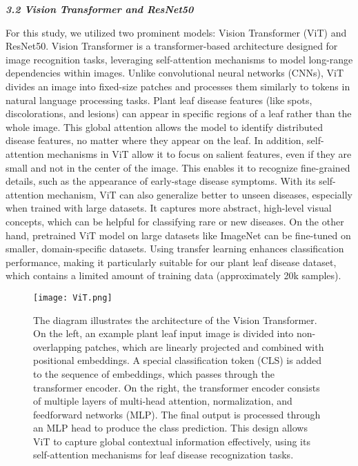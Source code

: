 \documentclass{article}
\begin{document}
\textbf{\textit{3.2 Vision Transformer and ResNet50}}

For this study, we utilized two prominent models: Vision Transformer (ViT) and ResNet50. Vision Transformer is a transformer-based architecture designed for image recognition tasks, leveraging self-attention mechanisms to model long-range dependencies within images. Unlike convolutional neural networks (CNNs), ViT divides an image into fixed-size patches and processes them similarly to tokens in natural language processing tasks. Plant leaf disease features (like spots, discolorations, and lesions) can appear in specific regions of a leaf rather than the whole image. This global attention allows the model to identify distributed disease features, no matter where they appear on the leaf. In addition, self-attention mechanisms in ViT allow it to focus on salient features, even if they are small and not in the center of the image. This enables it to recognize fine-grained details, such as the appearance of early-stage disease symptoms. With its self-attention mechanism, ViT can also generalize better to unseen diseases, especially when trained with large datasets. It captures more abstract, high-level visual concepts, which can be helpful for classifying rare or new diseases. On the other hand, pretrained ViT model on large datasets like ImageNet can be fine-tuned on smaller, domain-specific datasets. Using transfer learning enhances classification performance, making it particularly suitable for our plant leaf disease dataset, which contains a limited amount of training data (approximately 20k samples).

\begin{figure}[H]
\centering
\texttt{[image: ViT.png]}
\captionsetup{font=small}
\caption{The diagram illustrates the architecture of the Vision Transformer. On the left, an example plant leaf input image is divided into non-overlapping patches, which are linearly projected and combined with positional embeddings. A special classification token (CLS) is added to the sequence of embeddings, which passes through the transformer encoder. On the right, the transformer encoder consists of multiple layers of multi-head attention, normalization, and feedforward networks (MLP). The final output is processed through an MLP head to produce the class prediction. This design allows ViT to capture global contextual information effectively, using its self-attention mechanisms for leaf disease recognization tasks.}
\label{fig:vit}
\end{figure}
\end{document}
